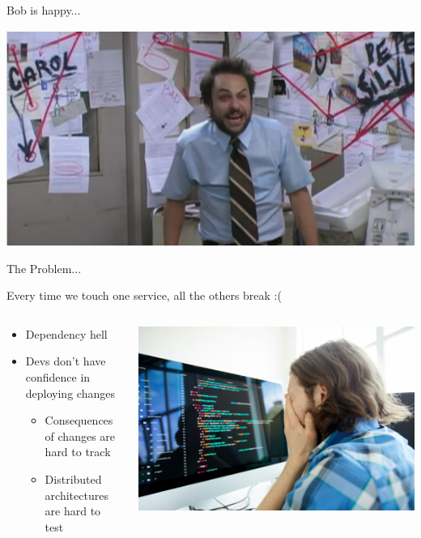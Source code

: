 \begin{frame}{Bob is happy...}
  \begin{center}
    \includegraphics[scale=.45]{./assets/chaos}
  \end{center}
\end{frame}

\begin{frame}{The Problem...}
  \begin{shadequote}
    \hspace{1cm} Every time we touch one service, all the others break :(
  \end{shadequote}
  \begin{columns}
    \begin{column}{0.6\textwidth}
      \begin{itemize}
        \item Dependency hell
        \item Devs don't have confidence in deploying changes
        \begin{itemize}
          \item Consequences of changes are hard to track
          \item Distributed architectures are hard to test
        \end{itemize}
      \end{itemize}
    \end{column}
    \begin{column}{0.4\textwidth}
      \includegraphics[scale=.3]{./assets/sad_dev.jpeg}
    \end{column}
  \end{columns}
  \end{frame}

